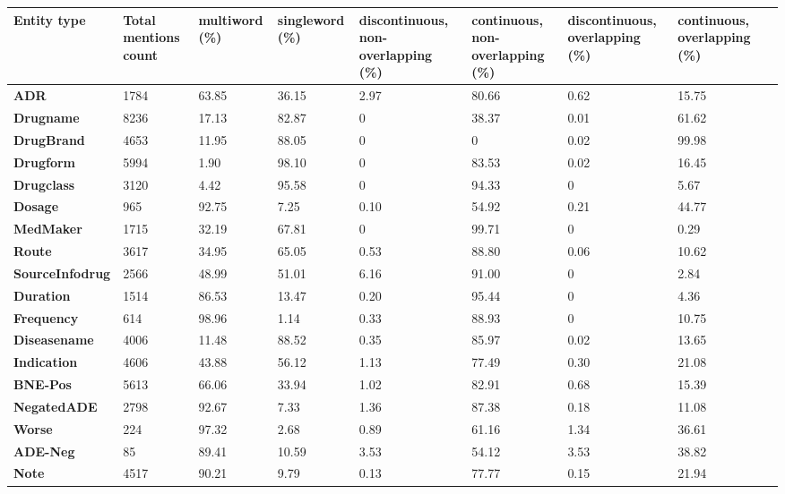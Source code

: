 \renewcommand{\arraystretch}{1.5}
\begin{tabular}{|p{2.0cm}|p{1.3cm}|p{1.4cm}|p{1.4cm}|p{2.0cm}|p{2.0cm}|p{2.0cm}|p{1.6cm}|c|} 
\hline
\textbf{Entity type}                                                         &  \textbf{Total mentions count} & \textbf{multiword (\%)} & \textbf{singleword (\%)} & \textbf{discontinuous, non-overlapping (\%)} & \textbf{continuous, non-overlapping (\%)} & \textbf{discontinuous, overlapping (\%)} & \textbf{continuous, overlapping (\%)} \\ 
\hline
\textbf{ADR}                                                       & 1784           & 63.85        & 36.15         & 2.97         & 80.66          & 0.62            & 15.75\\ \hline
\textbf{Drugname} & 8236 & 17.13 & 82.87 & 0 & 38.37 & 0.01 & 61.62 \\ \hline
\textbf{DrugBrand} & 4653 & 11.95 & 88.05 & 0 & 0 & 0.02 & 99.98 \\ \hline
\textbf{Drugform} & 5994 & 1.90 & 98.10 & 0 & 83.53 & 0.02 & 16.45 \\ \hline
\textbf{Drugclass} & 3120 & 4.42 & 95.58 & 0 & 94.33 & 0 & 5.67 \\ \hline
\textbf{Dosage} & 965 & 92.75 & 7.25 & 0.10 & 54.92 & 0.21 & 44.77 \\ \hline
\textbf{MedMaker} & 1715 & 32.19 & 67.81 & 0 & 99.71 & 0 & 0.29 \\ \hline
\textbf{Route} & 3617 & 34.95 & 65.05 & 0.53 & 88.80 & 0.06 & 10.62 \\ \hline
\textbf{SourceInfodrug} & 2566 & 48.99 & 51.01 & 6.16 & 91.00 & 0 & 2.84 \\ \hline
\textbf{Duration} & 1514 & 86.53 & 13.47 & 0.20 & 95.44 & 0 & 4.36 \\ \hline
\textbf{Frequency} & 614 & 98.96 & 1.14 & 0.33 & 88.93 & 0 & 10.75 \\ \hline
\textbf{Diseasename} & 4006 & 11.48 & 88.52 & 0.35 & 85.97 & 0.02 & 13.65 \\ \hline
\textbf{Indication} & 4606 & 43.88 & 56.12 & 1.13 & 77.49 & 0.30 & 21.08 \\ \hline
\textbf{BNE-Pos} & 5613 & 66.06 & 33.94 & 1.02 & 82.91 & 0.68 & 15.39 \\ \hline
\textbf{NegatedADE} & 2798 & 92.67 & 7.33 & 1.36 & 87.38 & 0.18 & 11.08 \\ \hline
\textbf{Worse} & 224 & 97.32 & 2.68 & 0.89 & 61.16 & 1.34 & 36.61 \\ \hline
\textbf{ADE-Neg} & 85 & 89.41 & 10.59 & 3.53 & 54.12 & 3.53 & 38.82 \\ \hline
\textbf{Note} & 4517 & 90.21 & 9.79 & 0.13 & 77.77 & 0.15 & 21.94 \\ 
\hline

\end{tabular}